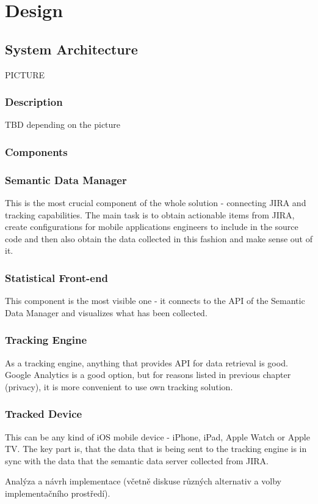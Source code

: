 \chapter{Design}

\section{System Architecture}

PICTURE

\subsection*{Description}
TBD depending on the picture

\subsection*{Components}
\subsection{Semantic Data Manager}

This is the most crucial component of the whole solution - connecting JIRA and tracking capabilities. The main task is to obtain actionable items from JIRA, create configurations for mobile applications engineers to include in the source code and then also obtain the data collected in this fashion and make sense out of it. 

\subsection{Statistical Front-end}

This component is the most visible one - it connects to the API of the Semantic Data Manager and visualizes what has been collected.

\subsection{Tracking Engine}

As a tracking engine, anything that provides API for data retrieval is good. Google Analytics is a good option, but for reasons listed in previous chapter (privacy), it is more convenient to use own tracking solution.

\subsection{Tracked Device}

This can be any kind of iOS mobile device - iPhone, iPad, Apple Watch or Apple TV. The key part is, that the data that is being sent to the tracking engine is in sync with the data that the semantic data server collected from JIRA.




Analýza a návrh implementace (včetně diskuse různých alternativ a volby implementačního prostředí).